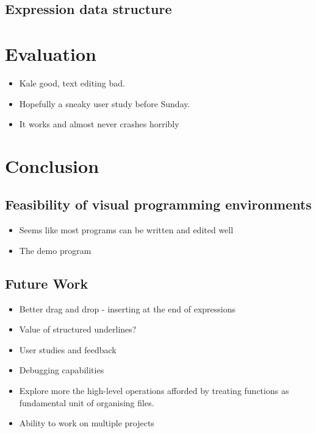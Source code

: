 \documentclass[11pt]{report}
\begin{document}
\section{Expression data structure}

\chapter{Evaluation}

\begin{itemize}[noitemsep]
	\item Kale good, text editing bad.
	\item Hopefully a sneaky user study before Sunday.
	\item It works and almost never crashes horribly
\end{itemize}

\chapter{Conclusion}
\section{Feasibility of visual programming environments}
\begin{itemize}[noitemsep]
	\item Seems like most programs can be written and edited well
	\item The demo program
\end{itemize}

\section{Future Work}

\begin{itemize}[noitemsep]
	\item Better drag and drop - inserting at the end of expressions
	\item Value of structured underlines?
	\item User studies and feedback
	\item Debugging capabilities
	\item Explore more the high-level operations afforded by treating functions as
	fundamental unit of organising files.
	\item Ability to work on multiple projects
\end{itemize}

\endgroup
\clearpage

\renewcommand*{\bibfont}{\raggedright}



\begin{appendices}
	
\end{appendices}
\end{document}
